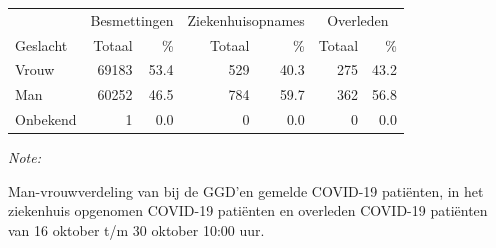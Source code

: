 \documentclass[
  english,
  man,floatsintext]{apa6}
\begin{document}
\begin{table}[H]
\centering\begingroup\fontsize{11}{13}\selectfont

\begin{threeparttable}
\begin{tabular}{lrrrrrr}
\toprule
\multicolumn{1}{c}{ } & \multicolumn{2}{c}{Besmettingen} & \multicolumn{2}{c}{Ziekenhuisopnames} & \multicolumn{2}{c}{Overleden} \\
\cmidrule(l{3pt}r{3pt}){2-3} \cmidrule(l{3pt}r{3pt}){4-5} \cmidrule(l{3pt}r{3pt}){6-7}
Geslacht & Totaal & \% & Totaal & \% & Totaal & \%\\
\midrule
Vrouw & 69183 & 53.4 & 529 & 40.3 & 275 & 43.2\\
Man & 60252 & 46.5 & 784 & 59.7 & 362 & 56.8\\
Onbekend & 1 & 0.0 & 0 & 0.0 & 0 & 0.0\\
\bottomrule
\end{tabular}
\begin{tablenotes}
\item \textit{Note: } 
\item Man-vrouwverdeling van bij de GGD’en gemelde COVID-19 patiënten, in het ziekenhuis opgenomen COVID-19 patiënten en overleden COVID-19 patiënten van 16 oktober t/m 30 oktober 10:00 uur.
\end{tablenotes}
\end{threeparttable}
\endgroup{}
\end{table}
\newpage
\end{document}
